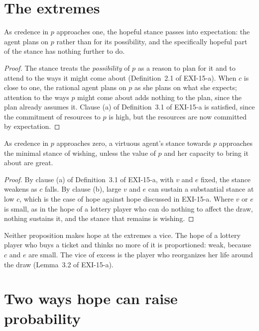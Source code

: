 \documentclass{situationist-preprint}
\begin{document}
\section{The extremes}

\begin{proposition}\label{p:high}
As credence in $p$ approaches one, the hopeful stance passes into expectation: the agent plans on $p$ rather than for its possibility, and the specifically hopeful part of the stance has nothing further to do.
\end{proposition}

\begin{proof}
The stance treats the \emph{possibility} of $p$ as a reason to plan for it and to attend to the ways it might come about (Definition~2.1 of EXI-15-a). When $c$ is close to one, the rational agent plans on $p$ as she plans on what she expects; attention to the ways $p$ might come about adds nothing to the plan, since the plan already assumes it. Clause (a) of Definition~3.1 of EXI-15-a is satisfied, since the commitment of resources to $p$ is high, but the resources are now committed by expectation.
\end{proof}

\begin{proposition}\label{p:low}
As credence in $p$ approaches zero, a virtuous agent's stance towards $p$ approaches the minimal stance of wishing, unless the value of $p$ and her capacity to bring it about are great.
\end{proposition}

\begin{proof}
By clause (a) of Definition~3.1 of EXI-15-a, with $v$ and $e$ fixed, the stance weakens as $c$ falls. By clause (b), large $v$ and $e$ can sustain a substantial stance at low $c$, which is the case of hope against hope discussed in EXI-15-a. Where $v$ or $e$ is small, as in the hope of a lottery player who can do nothing to affect the draw, nothing sustains it, and the stance that remains is wishing.
\end{proof}

Neither proposition makes hope at the extremes a vice. The hope of a lottery player who buys a ticket and thinks no more of it is proportioned: weak, because $c$ and $e$ are small. The vice of excess is the player who reorganizes her life around the draw (Lemma~3.2 of EXI-15-a).

\section{Two ways hope can raise probability}
\end{document}
